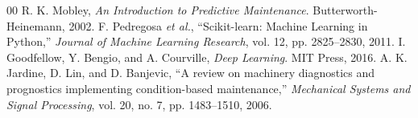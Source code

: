 \documentclass[conference]{IEEEtran}
\begin{document}

\begin{thebibliography}{00}
 R. K. Mobley, \textit{An Introduction to Predictive Maintenance}. Butterworth-Heinemann, 2002.
 F. Pedregosa \textit{et al.}, ``Scikit-learn: Machine Learning in Python,'' \textit{Journal of Machine Learning Research}, vol. 12, pp. 2825--2830, 2011.
 I. Goodfellow, Y. Bengio, and A. Courville, \textit{Deep Learning}. MIT Press, 2016.
 A. K. Jardine, D. Lin, and D. Banjevic, ``A review on machinery diagnostics and prognostics implementing condition-based maintenance,'' \textit{Mechanical Systems and Signal Processing}, vol. 20, no. 7, pp. 1483--1510, 2006.
\end{thebibliography}
\end{document}
